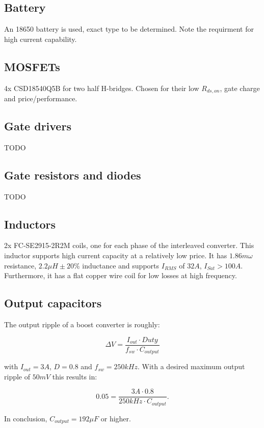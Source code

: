 \documentclass[]{article}
\begin{document}
\subsection{Battery}
An 18650 battery is used, exact type to be determined. Note the requirment for high current capability. 

\subsection{MOSFETs}
4x CSD18540Q5B for two half H-bridges. Chosen for their low $R_{ds,on}$, gate charge and price/performance. 

\subsection{Gate drivers}
TODO

\subsection{Gate resistors and diodes}
TODO

\subsection{Inductors}
2x FC-SE2915-2R2M coils, one for each phase of the interleaved converter. This inductor supports high current capacity at a relatively low price. It has $1.86m \omega$ resistance, $2.2\mu H \pm 20\%$ inductance and supports $I_{RMS}$ of $32A$, $I_{Sat} > 100A$. Furthermore, it has a flat copper wire coil for low losses at high frequency. 

\subsection{Output capacitors}
The output ripple of a boost converter is roughly:

\begin{equation}
	\Delta V = \frac{I_{out} \cdot Duty}{f_{sw} \cdot C_{output}}
\end{equation}

with $I_{out} = 3A$, $D=0.8$ and $f_{sw}=250kHz$. With a desired maximum output ripple of $50mV$ this results in: 

\begin{equation}
	0.05 = \frac{3A \cdot 0.8}{250kHz \cdot C_{output}}.
\end{equation}

\noindent In conclusion, $C_{output} = 192 \mu F$ or higher. \\
\end{document}
